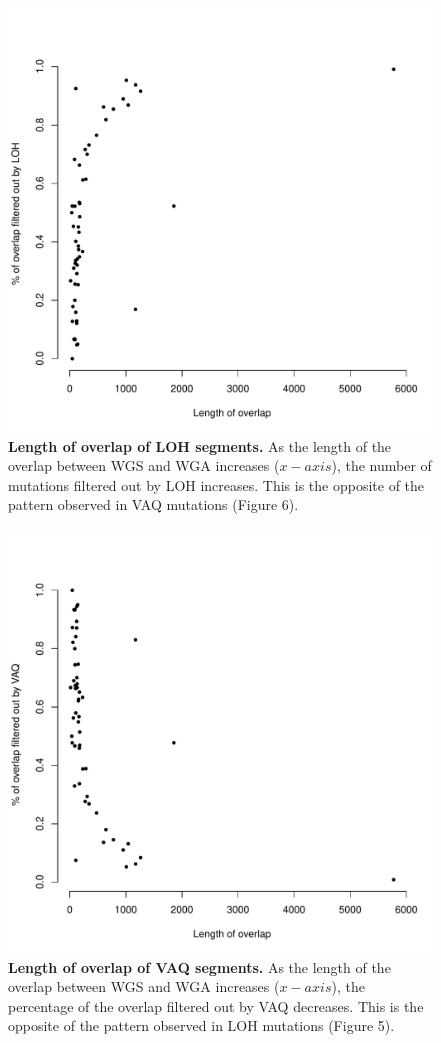 \documentclass[11pt]{article} %
\begin{document}
\begin{figure}
\centerline{
\includegraphics[width=5in]{./LOH_VAQ/LOH_all.pdf} }
\caption{\textbf{Length of overlap of LOH segments.} As the length of the overlap between WGS and WGA increases ($x-axis$), the number of mutations filtered out by LOH increases. This is the opposite of the pattern observed in VAQ mutations (Figure 6).}
\end{figure}

\begin{figure}
\centerline{
\includegraphics[width=5in]{./LOH_VAQ/VAQ_all.pdf} }
\caption{ \textbf{Length of overlap of VAQ segments.} As the length of the overlap between WGS and WGA increases ($x-axis$), the percentage of the overlap filtered out by VAQ decreases. This is the opposite of the pattern observed in LOH mutations (Figure 5).}
\end{figure}
\end{document}
